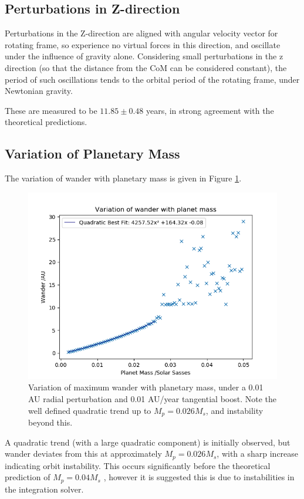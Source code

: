 \documentclass[11pt, a4paper,twocolumn]{article} %
\begin{document}
\subsection{Perturbations in Z-direction} \label{3D}
Perturbations in the Z-direction are aligned with angular velocity vector for rotating frame, so experience no virtual forces in this direction, and oscillate under the influence of gravity alone. Considering small perturbations in the z direction (so that the distance from the CoM can be considered constant), the period of such oscillations tends to the orbital period of the rotating frame, under Newtonian gravity.

These are measured to be $11.85 \pm 0.48$ years, in strong agreement with the theoretical predictions.

\subsection{Variation of Planetary Mass} \label{planet}
The variation of wander with planetary mass is given in Figure \ref{fig:planetmass}.

\begin{figure}
	\centering
	\includegraphics[width=0.8\linewidth]{Figures/wanderwithplanetmass_p5b}
	\caption{Variation of maximum wander with planetary mass, under a 0.01 AU radial perturbation and 0.01 AU/year tangential boost. Note the well defined quadratic trend up to $ M_{p} = 0.026 M_{s}$, and instability beyond this.}
	\label{fig:planetmass}
\end{figure}

A quadratic trend (with a large quadratic component) is initially observed, but wander deviates from this at approximately $ M_{p} = 0.026 M_{s}$, with a sharp increase indicating orbit instability. This occurs significantly before the theoretical prediction of $ M_{p} = 0.04 M_{s}$ \cite{Darwin1897}, however it is suggested this is due to instabilities in the integration solver.
\end{document}
